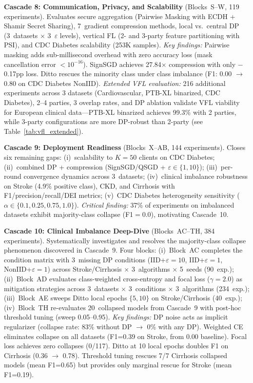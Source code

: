 \documentclass[conference]{IEEEtran}
\begin{document}
\smallskip\noindent\textbf{Cascade 8: Communication, Privacy, and Scalability} (Blocks~S--W, 119 experiments). Evaluates secure aggregation (Pairwise Masking with ECDH + Shamir Secret Sharing), 7~gradient compression methods, local vs.\ central DP (3~datasets $\times$ 3~$\varepsilon$ levels), vertical FL (2- and 3-party feature partitioning with PSI), and CDC Diabetes scalability (253K samples). \textit{Key findings:} Pairwise masking adds sub-millisecond overhead with zero accuracy loss (mask cancellation error $<10^{-16}$). SignSGD achieves 27.84$\times$ compression with only $-$0.17pp loss. Ditto rescues the minority class under class imbalance (F1: 0.00 $\to$ 0.80 on CDC Diabetes NonIID). \textit{Extended VFL evaluation:} 216 additional experiments across 3 datasets (Cardiovascular, PTB-XL binarized, CDC Diabetes), 2--4 parties, 3 overlap rates, and DP ablation validate VFL viability for European clinical data---PTB-XL binarized achieves 99.3\% with 2 parties, while 3-party configurations are more DP-robust than 2-party (see Table~\ref{tab:vfl_extended}).

\smallskip\noindent\textbf{Cascade 9: Deployment Readiness} (Blocks~X--AB, 144 experiments). Closes six remaining gaps: (i)~scalability to $K{=}50$ clients on CDC Diabetes; (ii)~combined DP + compression (SignSGD/QSGD + $\varepsilon{\in}\{1, 10\}$); (iii)~per-round convergence dynamics across 3~datasets; (iv)~clinical imbalance robustness on Stroke (4.9\% positive class), CKD, and Cirrhosis with F1/precision/recall/DEI metrics; (v)~CDC Diabetes heterogeneity sensitivity ($\alpha{\in}\{0.1, 0.25, 0.75, 1.0\}$). \textit{Critical finding:} 37\% of experiments on imbalanced datasets exhibit majority-class collapse (F1$=$0.0), motivating Cascade~10.

\smallskip\noindent\textbf{Cascade 10: Clinical Imbalance Deep-Dive} (Blocks~AC--TH, 384 experiments). Systematically investigates and resolves the majority-class collapse phenomenon discovered in Cascade~9. Four blocks: (i)~Block~AC completes the condition matrix with 3~missing DP conditions (IID+$\varepsilon{=}10$, IID+$\varepsilon{=}1$, NonIID+$\varepsilon{=}1$) across Stroke/Cirrhosis $\times$ 3~algorithms $\times$ 5~seeds (90~exp.); (ii)~Block~AD evaluates class-weighted cross-entropy and focal loss ($\gamma{=}2.0$) as mitigation strategies across 3~datasets $\times$ 3~conditions $\times$ 3~algorithms (234~exp.); (iii)~Block~AE sweeps Ditto local epochs $\{5, 10\}$ on Stroke/Cirrhosis (40~exp.); (iv)~Block~TH re-evaluates 20~collapsed models from Cascade~9 with post-hoc threshold tuning (sweep 0.05--0.95). \textit{Key findings:} DP noise acts as implicit regularizer (collapse rate: 83\% without DP $\to$ 0\% with any DP). Weighted CE eliminates collapse on all datasets (F1=0.39 on Stroke, from 0.00 baseline). Focal loss achieves zero collapses (0/117). Ditto at 10 local epochs doubles F1 on Cirrhosis (0.36 $\to$ 0.78). Threshold tuning rescues 7/7 Cirrhosis collapsed models (mean F1=0.65) but provides only marginal rescue for Stroke (mean F1=0.19).
\end{document}
